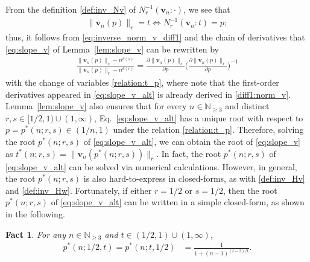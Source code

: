 \documentclass[conference, draftcls, onecolumn]{IEEEtran}
\theoremstyle{plain}
\newtheorem{fact}{Fact}
\newcommand{\bvec}[1]{\boldsymbol{#1}}
\newcommand{\lemref}[1]{Lemma~\ref{#1}}
\begin{document}
From the definition \eqref{def:inv_Nv} of $N_{r}^{-1}( \bvec{v}_{n} : \cdot )$, we see that
\begin{align}
\| \bvec{v}_{n}( p ) \|_{r} = t
\iff
N_{r}^{-1}( \bvec{v}_{n} : t ) = p ;
\label{relation:t_p}
\end{align}
thus, it follows from \eqref{eq:inverse_norm_v_diff1} and the chain of derivatives that \eqref{eq:slope_v} of \lemref{lem:slope_v} can be rewritten by
\begin{align}
\frac{ \| \bvec{v}_{n}( p ) \|_{s} - n^{\theta( s )} }{ \| \bvec{v}_{n}( p ) \|_{r} - n^{\theta( r )} }
=
\frac{ \partial \| \bvec{v}_{n}( p ) \|_{s} }{ \partial p } \bigg( \frac{ \partial \| \bvec{v}_{n}( p ) \|_{r} }{ \partial p } \bigg)^{-1}
\label{eq:slope_v_alt}
\end{align}
with the change of variables \eqref{relation:t_p}, where note that the first-order derivatives appeared in \eqref{eq:slope_v_alt} is already derived in \eqref{diff1:norm_v}.
\lemref{lem:slope_v} also ensures that for every $n \in \mathbb{N}_{\ge 3}$ and distinct $r, s \in [1/2, 1) \cup (1, \infty)$, Eq.~\eqref{eq:slope_v_alt} has a unique root with respect to $p = p^{\ast}(n; r, s) \in (1/n, 1)$ under the relation \eqref{relation:t_p}.
Therefore, solving the root $p^{\ast}(n; r, s)$ of \eqref{eq:slope_v_alt}, we can obtain the root of \eqref{eq:slope_v} as $t^{\ast}(n; r, s) = \| \bvec{v}_{n}( p^{\ast}(n; r, s) ) \|_{r}$.
In fact, the root $p^{\ast}(n; r, s)$ of \eqref{eq:slope_v_alt} can be solved via numerical calculations.
However, in general, the root $p^{\ast}(n; r, s)$ is also hard-to-express in closed-forms, as with \eqref{def:inv_Hv} and \eqref{def:inv_Hw}.
Fortunately, if either $r = 1/2$ or $s = 1/2$, then the root $p^{\ast}(n; r, s)$ of \eqref{eq:slope_v_alt} can be written in a simple closed-form, as shown in the following.





\begin{fact}
\label{fact:slope_v_half}
For any $n \in \mathbb{N}_{\ge 3}$ and $t \in (1/2, 1) \cup (1, \infty)$,
\begin{align}
p^{\ast}(n; 1/2, t)
=
p^{\ast}(n; t, 1/2)
& =
\frac{ 1 }{ 1 + ( n - 1 )^{(t-2)/t} } .
\label{eq:slope_v_half}
\end{align}
\end{fact}
\end{document}
